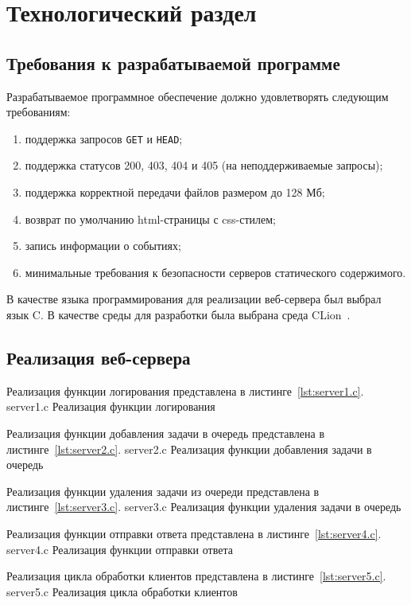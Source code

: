 \chapter{Технологический раздел}

\section{Требования к разрабатываемой программе}

Разрабатываемое программное обеспечение должно удовлетворять следующим требованиям:
\begin{enumerate}[leftmargin=1.6\parindent]
	\item поддержка запросов \texttt{GET} и \texttt{HEAD};
	\item поддержка статусов 200, 403, 404 и 405 (на неподдерживаемые запросы);
	\item поддержка корректной передачи файлов размером до 128 Мб;
	\item возврат по умолчанию html-страницы с css-стилем;
	\item запись информации о событиях;
	\item минимальные требования к безопасности серверов статического содержимого.
\end{enumerate}

В качестве языка программирования для реализации веб-сервера был выбрал язык C.
В качестве среды для разработки была выбрана среда CLion~\cite{c, clion}.

\clearpage
\section{Реализация веб-сервера}

Реализация функции логирования представлена в листинге~\ref{lst:server1.c}.
	{server1.c}
	{Реализация функции логирования}

Реализация функции добавления задачи в очередь представлена в листинге~\ref{lst:server2.c}.
	{server2.c}
	{Реализация функции добавления задачи в очередь}

\clearpage
Реализация функции удаления задачи из очереди представлена в листинге~\ref{lst:server3.c}.
	{server3.c}
	{Реализация функции удаления задачи в очередь}

Реализация функции отправки ответа представлена в листинге~\ref{lst:server4.c}.
	{server4.c}
	{Реализация функции отправки ответа}

\clearpage
Реализация цикла обработки клиентов представлена в листинге~\ref{lst:server5.c}.
	{server5.c}
	{Реализация цикла обработки клиентов}

